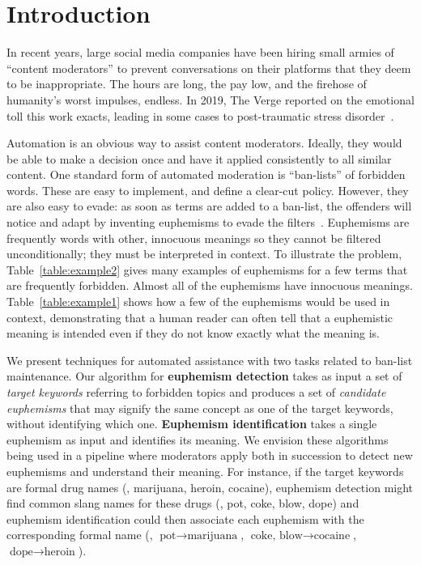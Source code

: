 \section{Introduction}
\label{sec:intro}

In recent years,
large social media companies have been hiring small armies of ``content moderators''
to prevent conversations on their platforms 
that they deem to be inappropriate.
The hours are long, 
the pay low, 
and the firehose of humanity's worst impulses, endless.
In 2019, The Verge reported on the emotional toll this work exacts,
leading in some cases
to post-traumatic stress disorder~\cite{newton2019terror, newton2019trauma}.

Automation is an obvious way to assist content moderators.
Ideally, they would be able to make a decision once
and have it applied consistently to all similar content.
One standard form of automated moderation is ``ban-lists'' of forbidden words.
These are easy to implement, and define a clear-cut policy.
However, they are also easy to evade:
as soon as terms are added to a ban-list,
the offenders will notice
and adapt by inventing euphemisms to evade the filters~\cite{ofcom:ai2019}.
Euphemisms are frequently words with other, innocuous meanings
so they cannot be filtered unconditionally;
they must be interpreted in context.
To illustrate the problem,
Table~\ref{table:example2} gives many examples of euphemisms
for a few terms that are frequently forbidden.
Almost all of the euphemisms have innocuous meanings.
Table~\ref{table:example1} shows how a few of the euphemisms
would be used in context, demonstrating that
a human reader can often tell that a euphemistic meaning is intended
even if they do not know exactly what the meaning is.

We present techniques for automated assistance
with two tasks related to ban-list maintenance.
Our algorithm for \textbf{euphemism detection}
takes as input a set of \textit{target keywords} referring to forbidden topics
and produces a set of \textit{candidate euphemisms}
that may signify the same concept as one of the target keywords,
without identifying which one.
\textbf{Euphemism identification} takes a single euphemism as input
and identifies its meaning.
We envision these algorithms being used in a pipeline
where moderators apply both in succession
to detect new euphemisms and understand their meaning.
For instance, if the target keywords are formal drug names 
(\eg, marijuana, heroin, cocaine),
euphemism detection might find common slang names for these drugs
(\eg, pot, coke, blow, dope)
and euphemism identification could then associate each euphemism
with the corresponding formal name
(\eg, $\text{pot} \longrightarrow \text{marijuana}$,
$\text{coke, blow} \longrightarrow \text{cocaine}$,
$\text{dope} \longrightarrow \text{heroin}$).


